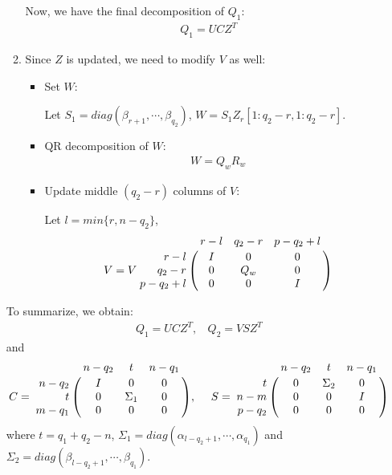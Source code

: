 \begin{enumerate}
\begin{enumerate}
                    Now, we have the final decomposition of $Q_1$:
                    \begin{align}
                        Q_1 = UCZ^{T}
                    \end{align}
                    \item Since $Z$ is updated, we need to modify $V$ as well:
                        \begin{itemize}
                            \item Set $W$:
                            
                                Let $S_1 = diag(\beta_{r+1}, \cdots, \beta_{q_2})$, $W = S_1Z_{r}[1:q_2-r,1:q_2-r]$.
                            \item QR decomposition of $W$:
                                \begin{align}
                                    W = Q_{w}R_{w}
                                \end{align}
                            \item Update middle $(q_2-r)$ columns of $V$:
                            
                                Let $l = min\{r, n-q_2\}$,
                                \begin{displaymath}
                                    V = V\bordermatrix{ & r-l & q_2-r & p-q_2+l \cr
                                    \hfill r-l & I & 0 & 0 \cr
                                    \hfill q_2-r & 0 & Q_{w} & 0 \cr
                                    \hfill p-q_2+l & 0 & 0 & I}
                                \end{displaymath}
                        \end{itemize}
            \end{enumerate}
            To summarize, we obtain:
            \begin{align}
                Q_1 = UCZ^{T}, \ \ \ \ Q_2 = VSZ^{T}
            \end{align}
            and
            \begin{displaymath}
                C = \bordermatrix{ & n-q_2 & t & n-q_1 \cr
                \hfill n-q_2 & I & 0 & 0 \cr
                \hfill t & 0 & \Sigma_1 & 0 \cr
                \hfill m-q_1 & 0 & 0 & 0}, \  \ \ \
                S = \bordermatrix{ & n-q_2 & t & n-q_1 \cr
                \hfill t & 0 & \Sigma_2 & 0 \cr
                \hfill n-m & 0 & 0 & I \cr
                \hfill p-q_2 & 0 & 0 & 0}
        \end{displaymath}
        where $t = q_1 + q_2 - n$, $\Sigma_1 = diag(\alpha_{l-q_2+1}, \cdots, \alpha_{q_1})$ and $\Sigma_2 = diag(\beta_{l-q_2+1}, \cdots, \beta_{q_1})$.
        

\end{enumerate}
